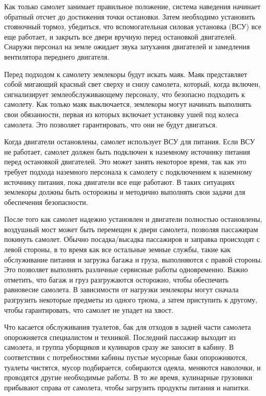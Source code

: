 Как только самолет занимает правильное положение, система наведения начинает обратный отсчет до достижения точки остановки.
Затем необходимо установить стояночный тормоз, убедиться, что вспомогательная силовая установка (ВСУ) все еще работает, и закрыть все двери вручную перед остановкой двигателей.
Снаружи персонал на земле ожидает звука затухания двигателей и замедления вентилятора переднего двигателя.

Перед подходом к самолету землекоры будут искать маяк.
Маяк представляет собой мигающий красный свет сверху и снизу самолета, который, когда включен, сигнализирует землеобслуживающему персоналу, что безопасно подходить к самолету.
Как только маяк выключается, землекоры могут начинать выполнять свои обязанности, первая из которых включает установку ушей под колеса самолета.
Это позволяет гарантировать, что они не будут двигаться.

Когда двигатели остановлены, самолет использует ВСУ для питания.
Если ВСУ не работает, самолет должен быть подключен к наземному источнику питания перед остановкой двигателей.
Это может занять некоторое время, так как это требует подхода наземного персонала к самолету с подключением к наземному источнику питания, пока двигатели все еще работают.
В таких ситуациях землекоры должны быть осторожны и методично выполнять свои задачи для обеспечения безопасности.

После того как самолет надежно установлен и двигатели полностью остановлены, воздушный мост может быть перемещен к двери самолета, позволяя пассажирам покинуть самолет.
Обычно посадка/высадка пассажиров и заправка происходят с левой стороны, в то время как все остальные земные службы, такие как обслуживание питания и загрузка багажа и груза, выполняются с правой стороны.
Это позволяет выполнять различные сервисные работы одновременно.
Важно отметить, что багаж и груз разгружаются осторожно, чтобы обеспечить равновесие самолета.
В зависимости от нагрузки землекоры могут сначала разгрузить некоторые предметы из одного трюма, а затем приступить к другому, чтобы гарантировать, что самолет не упадет на хвост.

Что касается обслуживания туалетов, бак для отходов в задней части самолета опорожняется специалистом и техникой.
Последний пассажир выходит из самолета, и группа уборщиков и кулинаров сразу же заносит в кабину.
В соответствии с потребностями кабины пустые мусорные баки опорожняются, туалеты чистятся, мусор подбирается, собираются одеяла, меняются наволочки, и проводятся другие необходимые работы.
В то же время, кулинарные грузовики прибывают справа от самолета, чтобы загрузить продукты питания и напитки.

